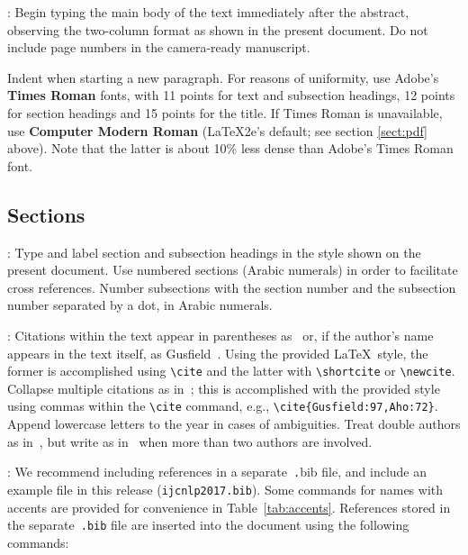 \documentclass[11pt,letterpaper]{article}
\begin{document}
: Begin typing the main body of the text immediately
after the abstract, observing the two-column format as shown in the present
document. Do not include page numbers in the camera-ready manuscript.  

Indent when starting a new paragraph. For reasons of uniformity,
use Adobe's {\bf Times Roman} fonts, with 11 points for text and 
subsection headings, 12 points for section headings and 15 points for
the title.  If Times Roman is unavailable, use {\bf Computer Modern
  Roman} (\LaTeX2e{}'s default; see section \ref{sect:pdf} above).
Note that the latter is about 10\% less dense than Adobe's Times Roman
font.

\subsection{Sections}

: Type and label section and subsection headings in
the style shown on the present document.  Use numbered sections (Arabic
numerals) in order to facilitate cross references. Number subsections
with the section number and the subsection number separated by a dot,
in Arabic numerals. 

: Citations within the text appear in parentheses
as~\cite{Gusfield:97} or, if the author's name appears in the text itself,
as Gusfield~.  Using the provided \LaTeX\ style, the
former is accomplished using {\small\verb|\cite|} and the latter with
{\small\verb|\shortcite|} or {\small\verb|\newcite|}.  Collapse multiple
citations as in~\cite{Gusfield:97,Aho:72}; this is accomplished with the
provided style using commas within the {\small\verb|\cite|} command, e.g.,
{\small\verb|\cite{Gusfield:97,Aho:72}|}. Append lowercase letters to the
year in cases of ambiguities. Treat double authors as in~\cite{Aho:72}, but
write as in~\cite{Chandra:81} when more than two authors are involved.  

:  We recommend
including references in a separate~{\small\texttt .bib} file, and include
an example file in this release ({\small\tt ijcnlp2017.bib}). Some commands
for names with accents are provided for convenience in
Table~\ref{tab:accents}. References stored in the separate~{\small\tt .bib}
file are inserted into the document using the following commands:

\small
\begin{verbatim}


\end{verbatim}
\normalsize 
\end{document}
